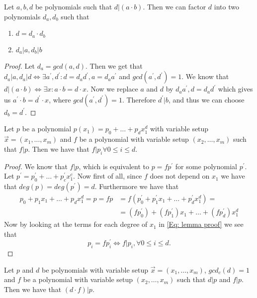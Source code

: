 \begin{lemma}\label{Lemma0}
  Let $a,b,d$ be polynomials such that $d|(a\cdot b)$. Then we can factor $d$ into two polynomials $d_a,d_b$ such that
  \begin{enumerate}
    \item $d = d_a\cdot d_b$
    \item $d_a|a, d_b|b$
  \end{enumerate}
\end{lemma}
\begin{proof}
  Let $d_a = gcd(a,d)$. Then we get that $d_a|a, d_a|d \iff \exists a^\prime,d^\prime: d=d_ad^\prime, a=d_aa^\prime$ and $gcd(a^\prime,d^\prime)=1$. We know that $d|(a\cdot b) \iff \exists x: a\cdot b=d\cdot x$. Now we replace $a$ and $d$ by $d_aa^\prime, d=d_ad^\prime$ which gives us $a^\prime\cdot b=d^\prime \cdot x$, where $gcd(a^\prime,d^\prime)=1$. Therefore $d^\prime|b$, and thus we can choose $d_b=d^\prime$.
\end{proof}
\begin{lemma}\label{Lemma1}
  Let $p$ be a polynomial $p(x_1)=p_0+\ldots+p_dx_1^d$ with variable setup $\vec{x}=(x_1,\ldots,x_m)$ and $f$ be a polynomial with variable setup $(x_2,\ldots,x_m)$ such that $f|p$. Then we have that $f|p_i\forall 0\leq i\leq d$.
\end{lemma}
\begin{proof}
  We know that $f|p$, which is equivalent to $p=fp^\prime$ for some polynomial $p^\prime$. Let $p^\prime=p_0^\prime+\ldots+p_c^\prime x_1^c$. Now first of all, since $f$ does not depend on $x_1$ we have that $deg(p)=deg(p^\prime)=d$. Furthermore we have that
  \begin{equation}\label{Eq: lemma proof}
    \begin{split}
      p_0+p_1x_1+\ldots+p_dx_1^d=p=fp &=f(p_0^\prime+p_1^\prime x_1+\ldots+p_d^\prime x_1^d)= \\
      &=(fp_0^\prime)+(fp_1^\prime)x_1+\ldots+(fp_d^\prime)x_1^d
    \end{split}
  \end{equation}
  Now by looking at the terms for each degree of $x_1$ in \ref{Eq: lemma proof} we see that
  \begin{equation}
    p_i=fp_i^\prime \iff f|p_i, \forall 0\leq i\leq d.
  \end{equation}
\end{proof}
\begin{lemma}\label{Lemma2}
  Let $p$ and $d$ be polynomials with variable setup $\vec{x}=(x_1,\ldots,x_m)$, $gcd_c(d)=1$ and $f$ be a polynomial with variable setup $(x_2,\ldots,x_m)$ such that $d|p$ and $f|p$. Then we have that $(d\cdot f)|p$.
\end{lemma}
